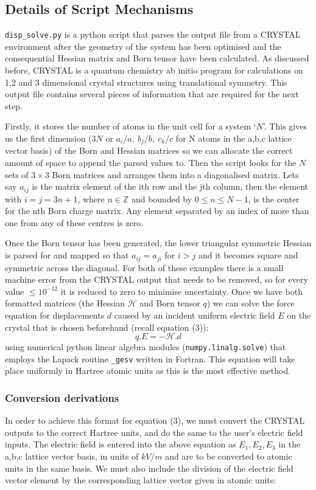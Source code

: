\documentclass[10pt]{article}
\begin{document}
\subsection{Details of Script Mechanisms}

\texttt{disp\_solve.py} is a python script that parses the output file from a CRYSTAL environment after the geometry of the system has been optimised and the consequential Hessian matrix and Born tensor have been calculated. As discussed before, CRYSTAL is a quantum chemistry ab initio program for calculations on 1,2 and 3 dimensional crystal structures using translational symmetry. This output file contains several pieces of information that are required for the next step. 

Firstly, it stores the number of atoms in the unit cell for a system `$N$'. This gives us the first dimension ($3N$ or $a_i/a,\ b_j/b,\ c_k/c$ for N atoms in the a,b,c lattice vector basis) of the Born and Hessian matrices so we can allocate the correct amount of space to append the parsed values to. Then the script looks for the $N$ sets of $3\times3$ Born matrices and arranges them into a diagonalised matrix. Lets say $a_{ij}$ is the matrix element of the ith row and the jth column, then the element with $i = j = 3n+1$, where $n \in \mathbb{Z}$ and bounded by $0 \leq n \leq N-1$, is the center for the nth Born charge matrix. Any element separated by an index of more than one from any of these centres is zero.

Once the Born tensor has been generated, the lower triangular symmetric Hessian is parsed for and mapped so that $a_{ij} = a_{ji}$ for $i > j$ and it becomes square and symmetric across the diagonal. For both of these examples there is a small machine error from the CRYSTAL output that needs to be removed, so for every value $\leq 10^{-12}$ it is reduced to zero to minimise uncertainty. Once we have both formatted matrices (the Hessian $\mathcal{H}$ and Born tensor $q$) we can solve the force equation for displacements $d$ caused by an incident uniform electric field $E$ on the crystal that is chosen beforehand (recall equation (3)):
\begin{equation*}
q.E = -\mathcal{H}.d
\end{equation*}
using numerical python linear algebra modules (\texttt{numpy.linalg.solve}) that employs the Lapack routine \texttt{\_gesv} written in Fortran. This equation will take place uniformly in Hartree atomic units as this is the most effective method.

\subsubsection{Conversion derivations}
In order to achieve this format for equation (3), we must convert the CRYSTAL outputs to the correct Hartree units, and do the same to the user's electric field inputs. The electric field is entered into the above equation as $E_1,E_2,E_3$ in the a,b,c lattice vector basis, in units of $kV/m$ and are to be converted to atomic units in the same basis. We must also include the division of the electric field vector element by the corresponding lattice vector given in atomic units: 
\end{document}
